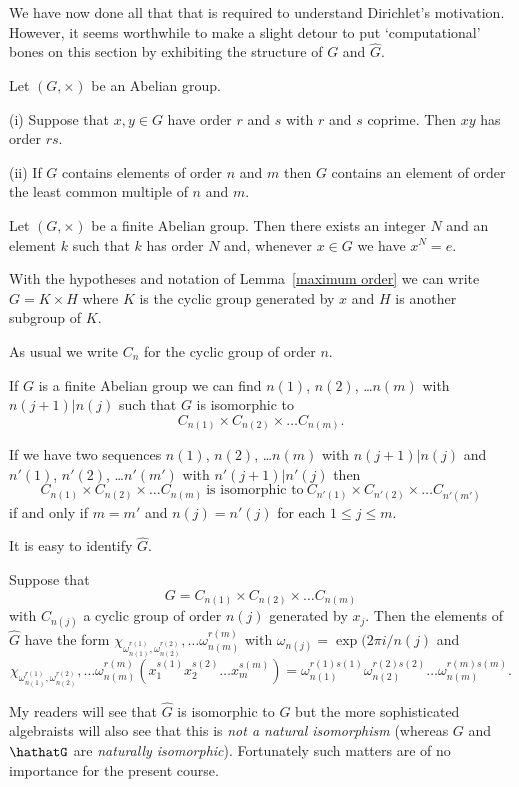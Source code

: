 We have now done all that that is required to
understand Dirichlet's motivation. However, it
seems worthwhile to make a slight detour to
put `computational' bones on this section by
exhibiting the structure of $G$ and $\hat{G}$.
\begin{lemma} Let $(G,\times)$ be an Abelian group.

(i) Suppose that $x,y\in G$ have order $r$ and $s$
with $r$ and $s$ coprime. Then $xy$ has order $rs$.

(ii) If $G$ contains elements of order $n$ and $m$
then $G$ contains an element of order the least
common multiple of $n$ and $m$.
\end{lemma}
\begin{lemma}\label{maximum order}
Let $(G,\times)$ be a finite Abelian group.
Then there exists an integer $N$ and an element $k$
such that $k$ has order $N$ and, whenever $x\in G$
we have $x^{N}=e$.
\end{lemma}
\begin{lemma} With the hypotheses and notation
of Lemma~\ref{maximum order} we can write $G=K\times H$
where $K$ is the cyclic group generated by $x$
and $H$ is another subgroup of $K$.
\end{lemma}
As usual we write $C_{n}$ for the cyclic group
of order $n$.
\begin{theorem} If $G$ is a finite Abelian group we can find
$n(1)$, $n(2)$, \dots $n(m)$ with $n(j+1)|n(j)$
such that $G$ is isomorphic to 
\[C_{n(1)}\times C_{n(2)}\times \dots C_{n(m)}.\]
\end{theorem}
\begin{lemma} If we have two sequences
$n(1)$, $n(2)$, \dots $n(m)$ with $n(j+1)|n(j)$
and
$n'(1)$, $n'(2)$, \dots $n'(m')$ with $n'(j+1)|n'(j)$
then
\[C_{n(1)}\times C_{n(2)}\times \dots C_{n(m)}
\ \text{is isomorphic to}
\ C_{n'(1)}\times C_{n'(2)}\times \dots C_{n'(m')}\]
if and only if $m=m'$ and $n(j)=n'(j)$ for each $1\leq j\leq m$.
\end{lemma}

It is easy to identify $\hat{G}$.
\begin{lemma} Suppose that
\[G=C_{n(1)}\times C_{n(2)}\times \dots C_{n(m)}\]
with $C_{n(j)}$ a cyclic group of order $n(j)$ generated
by $x_{j}$. Then the elements of $\hat{G}$ have the
form 
$\chi_{\omega_{n(1)}^{r(1)},\omega_{n(2)}^{r(2)}},\dots
\omega_{n(m)}^{r(m)}$ with $\omega_{n(j)}=\exp(2\pi i/n(j)$
and
\[\chi_{\omega_{n(1)}^{r(1)},\omega_{n(2)}^{r(2)}},\dots
\omega_{n(m)}^{r(m)}(x_{1}^{s(1)}x_{2}^{s(2)}\dots x_{m}^{s(m)})
=\omega_{n(1)}^{r(1)s(1)}\omega_{n(2)}^{r(2)s(2)}\dots
\omega_{n(m)}^{r(m)s(m)}.\]
\end{lemma}
My readers will see that $\hat{G}$ is isomorphic to $G$
but the more sophisticated algebraists will also
see that this is \emph{not a natural isomorphism}
(whereas $G$ and $\hathatG$ are \emph{naturally isomorphic}).
Fortunately such matters are of no importance
for the present course.
